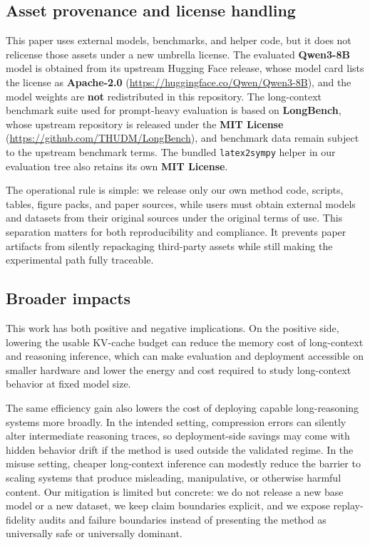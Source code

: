 \subsection{Asset provenance and license handling}


This paper uses external models, benchmarks, and helper code, but it does not relicense those assets under a new umbrella license. \CASKRepoLicenseSentence The evaluated \textbf{Qwen3-8B} model is obtained from its upstream Hugging Face release, whose model card lists the license as \textbf{Apache-2.0} (\url{https://huggingface.co/Qwen/Qwen3-8B}), and the model weights are \textbf{not} redistributed in this repository. The long-context benchmark suite used for prompt-heavy evaluation is based on \textbf{LongBench}, whose upstream repository is released under the \textbf{MIT License} (\url{https://github.com/THUDM/LongBench}), and benchmark data remain subject to the upstream benchmark terms. The bundled \texttt{latex2sympy} helper in our evaluation tree also retains its own \textbf{MIT License}.


The operational rule is simple: we release only our own method code, scripts, tables, figure packs, and paper sources, while users must obtain external models and datasets from their original sources under the original terms of use. This separation matters for both reproducibility and compliance. It prevents paper artifacts from silently repackaging third-party assets while still making the experimental path fully traceable.


\subsection{Broader impacts}


This work has both positive and negative implications. On the positive side, lowering the usable KV-cache budget can reduce the memory cost of long-context and reasoning inference, which can make evaluation and deployment accessible on smaller hardware and lower the energy and cost required to study long-context behavior at fixed model size.


The same efficiency gain also lowers the cost of deploying capable long-reasoning systems more broadly. In the intended setting, compression errors can silently alter intermediate reasoning traces, so deployment-side savings may come with hidden behavior drift if the method is used outside the validated regime. In the misuse setting, cheaper long-context inference can modestly reduce the barrier to scaling systems that produce misleading, manipulative, or otherwise harmful content. Our mitigation is limited but concrete: we do not release a new base model or a new dataset, we keep claim boundaries explicit, and we expose replay-fidelity audits and failure boundaries instead of presenting the method as universally safe or universally dominant.


